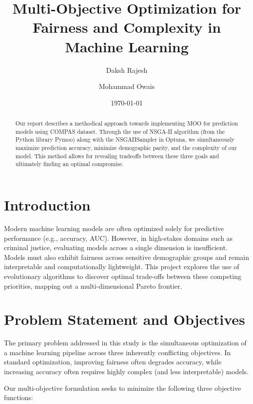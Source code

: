 \documentclass[12pt, a4paper]{article}
\title{Multi-Objective Optimization for Fairness and Complexity in Machine Learning}
\author{Daksh Rajesh \and Mohammad Owais}
\date{\today}
\begin{document}
\maketitle

\begin{abstract}
Our report describes a methodical approach towards implementing MOO for prediction models using COMPAS dataset. Through the use of NSGA-II algorithm (from the Python library Pymoo) along with the NSGAIISampler in Optuna, we simultaneously maximize prediction accuracy, minimize demographic parity, and the complexity of our model. This method allows for revealing tradeoffs between these three goals and ultimately finding an optimal compromise.
\end{abstract}

\section{Introduction}
Modern machine learning models are often optimized solely for predictive performance (e.g., accuracy, AUC). However, in high-stakes domains such as criminal justice, evaluating models across a single dimension is insufficient. Models must also exhibit fairness across sensitive demographic groups and remain interpretable and computationally lightweight. This project explores the use of evolutionary algorithms to discover optimal trade-offs between these competing priorities, mapping out a multi-dimensional Pareto frontier.

\section{Problem Statement and Objectives}
The primary problem addressed in this study is the simultaneous optimization of a machine learning pipeline across three inherently conflicting objectives. In standard optimization, improving fairness often degrades accuracy, while increasing accuracy often requires highly complex (and less interpretable) models.

Our multi-objective formulation seeks to minimize the following three objective functions:
\end{document}
